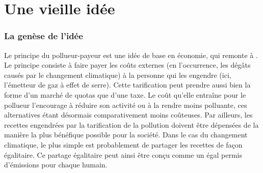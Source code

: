 \documentclass[a5paper,french,openany]{memoir}
\begin{document}
\section{Une vieille idée} 

\subsubsection{La genèse de l'idée}
Le principe du pollueur-payeur est une idée de base en économie, qui remonte à \citet{pigou_economics_1920}. Le principe consiste à faire payer les coûts externes (en l'occurrence, les dégâts causés par le changement climatique) à la personne qui les engendre (ici, l'émetteur de gaz à effet de serre). Cette tarification peut prendre aussi bien la forme d'un marché de quotas que d'une taxe. Le coût qu'elle entraîne pour le pollueur l'encourage à réduire son activité ou à la rendre moins polluante, ces alternatives étant désormais comparativement moins coûteuses. %
Par ailleurs, les recettes engendrées par la tarification de la pollution doivent être dépensées de la manière la plus bénéfique possible pour la société.  
Dans le cas du changement climatique, le plus simple est probablement de partager les recettes de façon égalitaire. Ce partage égalitaire peut ainsi être conçu comme un égal permis d'émissions pour chaque humain. 
\end{document}
